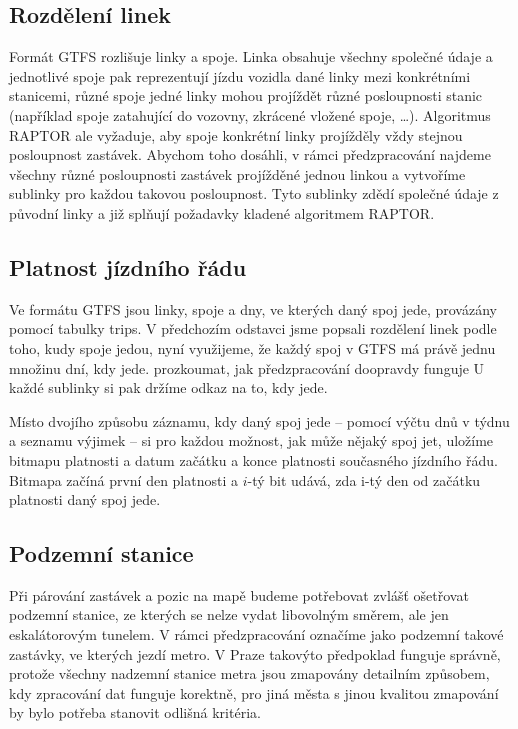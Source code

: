 \subsection{Rozdělení linek}
Formát GTFS rozlišuje linky a spoje. Linka obsahuje všechny společné údaje a
jednotlivé spoje pak reprezentují jízdu vozidla dané linky mezi konkrétními
stanicemi, různé spoje jedné linky mohou projíždět různé posloupnosti stanic
(například spoje zatahující do vozovny, zkrácené vložené spoje, \dots).
Algoritmus RAPTOR ale vyžaduje, aby spoje konkrétní linky projížděly vždy
stejnou posloupnost zastávek. Abychom toho dosáhli, v rámci předzpracování
najdeme všechny různé posloupnosti zastávek projížděné jednou linkou a vytvoříme
sublinky pro každou takovou posloupnost. Tyto sublinky zdědí společné údaje z
původní linky a již splňují požadavky kladené algoritmem RAPTOR. 

\subsection{Platnost jízdního řádu}
Ve formátu GTFS jsou linky, spoje a dny, ve kterých daný spoj jede, provázány
pomocí tabulky trips. V předchozím odstavci jsme popsali rozdělení linek podle
toho, kudy spoje jedou, nyní využijeme, že každý spoj v GTFS má právě jednu
množinu dní, kdy jede. \TODO prozkoumat, jak předzpracování doopravdy funguje
U každé sublinky si pak držíme odkaz na to, kdy jede.

Místo dvojího způsobu záznamu, kdy daný spoj jede -- pomocí výčtu dnů v týdnu a
seznamu výjimek -- si pro každou možnost, jak může nějaký spoj jet, uložíme
bitmapu platnosti a datum začátku a konce platnosti současného jízdního řádu. 
Bitmapa začíná první den platnosti a $i$-tý bit udává, zda i-tý den od začátku
platnosti daný spoj jede.  

\subsection{Podzemní stanice}
Při párování zastávek a pozic na mapě budeme potřebovat zvlášť ošetřovat
podzemní stanice, ze kterých se nelze vydat libovolným směrem, ale jen
eskalátorovým tunelem. V rámci předzpracování označíme jako podzemní takové
zastávky, ve kterých jezdí metro. V Praze takovýto předpoklad funguje správně,
protože všechny nadzemní stanice metra jsou zmapovány detailním způsobem, kdy
zpracování dat funguje korektně, pro jiná města s jinou kvalitou zmapování by
bylo potřeba stanovit odlišná kritéria.


